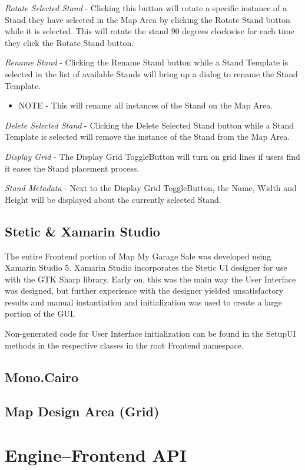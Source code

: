 \documentclass{report}
\begin{document}
\emph{Rotate Selected Stand} - Clicking this button will rotate a specific instance of a Stand they have selected in the Map Area by clicking the Rotate Stand button while it is selected.  This will rotate the stand 90 degrees clockwise for each time they click the Rotate Stand button.

\emph{Rename Stand} - Clicking the Rename Stand button while a Stand Template is selected in the list of available Stands will bring up a dialog to rename the Stand Template.  

\begin{itemize}
	\item NOTE - This will rename all instances of the Stand on the Map Area.
\end{itemize}

\emph{Delete Selected Stand} - Clicking the Delete Selected Stand button while a Stand Template is selected will remove the instance of the Stand from the Map Area.

\emph{Display Grid} - The Display Grid ToggleButton will turn on grid lines if users find it eases the Stand placement process.

\emph{Stand Metadata} - Next to the Display Grid ToggleButton, the Name, Width and Height will be displayed about the currently selected Stand.

\section{Stetic \& Xamarin Studio}
The entire Frontend portion of Map My Garage Sale was developed using Xamarin Studio 5.  Xamarin Studio incorporates the Stetic UI designer for use with the GTK Sharp library.  Early on, this was the main way the User Interface was designed, but further experience with the designer yielded unsatisfactory results and manual instantiation and initialization was used to create a large portion of the GUI.

Non-generated code for User Interface initialization can be found in the SetupUI methods in the respective classes in the root Frontend namespace.


\section{Mono.Cairo}

\section{Map Design Area (Grid)}



\chapter{Engine--Frontend API}
\end{document}
